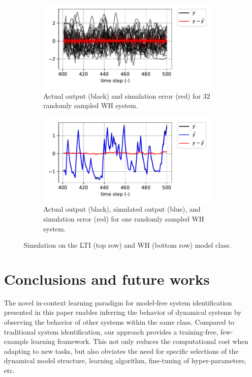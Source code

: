 \documentclass{article}
\begin{document}
\begin{figure}
    \begin{subfigure}[t]{0.49\textwidth}
        \centering
        \includegraphics[width=\textwidth]{fig/wh_sim_batch.pdf}
        \caption{Actual output (black) and simulation error (red) for $32$ randomly sampled WH system.}
        \label{fig:wh_sim_batch}
    \end{subfigure}
    \hfill
    \begin{subfigure}[t]{0.49\textwidth}
        \centering
        \includegraphics[width=\textwidth]{fig/wh_sim_single.pdf}
        \caption{Actual output (black), simulated output (blue), and simulation error (red) for one randomly sampled WH system.}
        \label{fig:wh_sim_single}
    \end{subfigure}
    
    \caption{Simulation on the LTI (top row) and WH (bottom row) model class.}
    \label{fig:sim}
\end{figure}



\section{Conclusions and future works}
The novel in-context learning paradigm for model-free system identification presented in this paper enables inferring the behavior of dynamical systems by observing the behavior of other systems within the same class. Compared to traditional system identification, our approach provides a training-free, few-example learning framework. This not only reduces the computational cost when adapting to new tasks, but also obviates the need for specific selections of the dynamical model structure, learning algorithm, fine-tuning of hyper-parameters, etc. 
\end{document}
